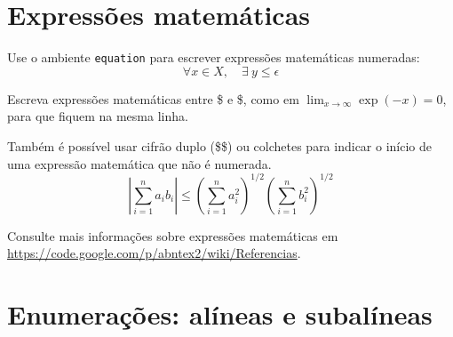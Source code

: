 \documentclass[12pt,oneside,a4paper,chapter=TITLE,english,brazil]{abntex2}
\begin{document}
\begin{anexosenv}
\section{Expressões matemáticas}

Use o ambiente \texttt{equation} para escrever expressões matemáticas numeradas:
\begin{equation}
  \forall x \in X, \quad \exists \: y \leq \epsilon
\end{equation}

Escreva expressões matemáticas entre \$ e \$, como em $ \lim_{x \to \infty} \exp(-x) = 0 $, para que fiquem na mesma linha.

Também é possível usar cifrão duplo (\$\$) ou colchetes para indicar o início de uma expressão matemática que não é numerada.
$$
\left|\sum_{i=1}^n a_ib_i\right|
\le
\left(\sum_{i=1}^n a_i^2\right)^{1/2}
\left(\sum_{i=1}^n b_i^2\right)^{1/2}
$$

Consulte mais informações sobre expressões matemáticas em \url{https://code.google.com/p/abntex2/wiki/Referencias}.

\section{Enumerações: alíneas e subalíneas}


\end{anexosenv}
\end{document}
